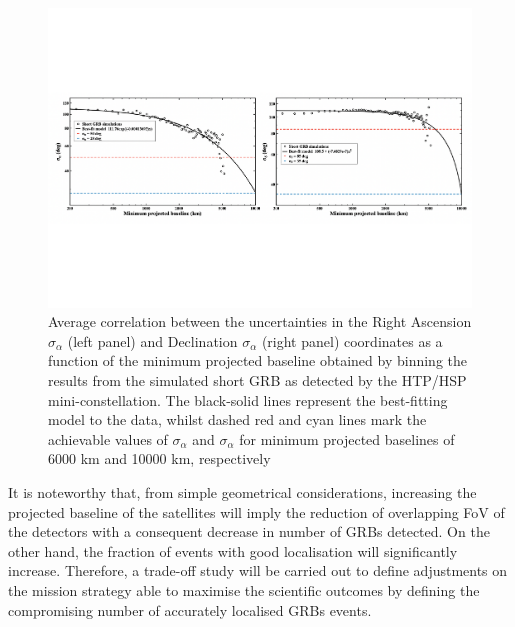 \documentclass[]{spie}  %
\begin{document}
\begin{figure}[h!]
\centering
\includegraphics[scale=0.6,angle=0]{fig_all_pos_short_reb}
\vspace{-4cm}
\caption{Average correlation between the uncertainties in the Right Ascension $\sigma_\alpha$ (left panel) and Declination $\sigma_\alpha$ (right panel) coordinates as a function of the minimum projected baseline obtained by binning the results from the simulated short GRB as detected by the HTP/HSP mini-constellation. The black-solid lines represent the best-fitting model to the data, whilst dashed red and cyan lines mark the achievable values of $\sigma_\alpha$ and $\sigma_\alpha$ for minimum projected baselines of 6000 km and 10000 km, respectively} 
\label{fig:all_pos_short_reb}
\end{figure}

It is noteworthy that, from simple geometrical considerations, increasing the projected baseline of the satellites will imply the reduction of overlapping FoV of the detectors with a consequent decrease in number of GRBs detected. On the other hand, the fraction of events with good localisation will significantly increase. Therefore, a trade-off study will be carried out to define adjustments on the mission strategy able to maximise the scientific outcomes by defining the compromising number of accurately localised GRBs events.

\end{document}
